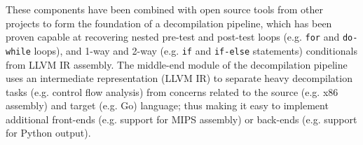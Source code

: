 These components have been combined with open source tools from other projects to form the foundation of a decompilation pipeline, which has been proven capable at recovering nested pre-test and post-test loops (e.g. \texttt{for} and \texttt{do-while} loops), and 1-way and 2-way (e.g. \texttt{if} and \texttt{if-else} statements) conditionals from LLVM IR assembly. The middle-end module of the decompilation pipeline uses an intermediate representation (LLVM IR) to separate heavy decompilation tasks (e.g. control flow analysis) from concerns related to the source (e.g. x86 assembly) and target (e.g. Go) language; thus making it easy to implement additional front-ends (e.g. support for MIPS assembly) or back-ends (e.g. support for Python output).


